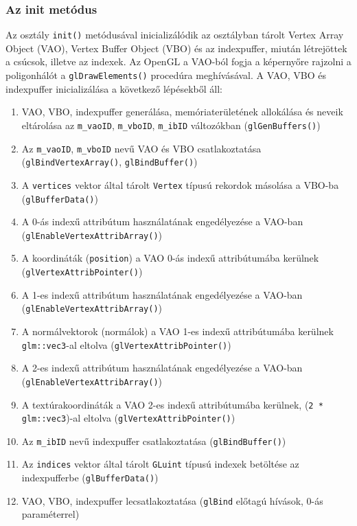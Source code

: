 \subsubsection{Az init metódus}

Az osztály \verb|init()| metódusával inicializálódik az osztályban tárolt Vertex Array Object (VAO), Vertex Buffer Object (VBO) és az indexpuffer, miután létrejöttek a csúcsok, illetve az indexek. Az OpenGL a VAO-ból fogja a képernyőre rajzolni a poligonhálót a \verb|glDrawElements()| procedúra meghívásával. A VAO, VBO és indexpuffer inicializálása a következő lépésekből áll:

\begin{enumerate}
	\item VAO, VBO, indexpuffer generálása, memóriaterületének allokálása és neveik eltárolása az \verb|m_vaoID|, \verb|m_vboID|, \verb|m_ibID| változókban (\verb|glGenBuffers()|)
	\item Az \verb|m_vaoID|, \verb|m_vboID| nevű VAO és VBO csatlakoztatása (\verb|glBindVertexArray()|, \verb|glBindBuffer()|)
	\item A \verb|vertices| vektor által tárolt \verb|Vertex| típusú rekordok másolása a VBO-ba (\verb|glBufferData()|)
	\item A 0-ás indexű attribútum használatának engedélyezése a VAO-ban (\verb|glEnableVertexAttribArray()|)
	\item A koordináták (\verb|position|) a VAO 0-ás indexű attribútumába kerülnek (\verb|glVertexAttribPointer()|)
	\item A 1-es indexű attribútum használatának engedélyezése a VAO-ban (\verb|glEnableVertexAttribArray()|)
	\item A normálvektorok (normálok) a VAO 1-es indexű attribútumába kerülnek \verb|glm::vec3|-al eltolva (\verb|glVertexAttribPointer()|)
	\item A 2-es indexű attribútum használatának engedélyezése a VAO-ban (\verb|glEnableVertexAttribArray()|)
	\item A textúrakoordináták a VAO 2-es indexű attribútumába kerülnek, (\verb|2 * glm::vec3|)-al eltolva (\verb|glVertexAttribPointer()|)
	\item Az \verb|m_ibID| nevű indexpuffer csatlakoztatása (\verb|glBindBuffer()|)
	\item Az \verb|indices| vektor által tárolt \verb|GLuint| típusú indexek betöltése az indexpufferbe (\verb|glBufferData()|)
	\item VAO, VBO, indexpuffer lecsatlakoztatása (\verb|glBind| előtagú hívások, 0-ás paraméterrel)
\end{enumerate}

